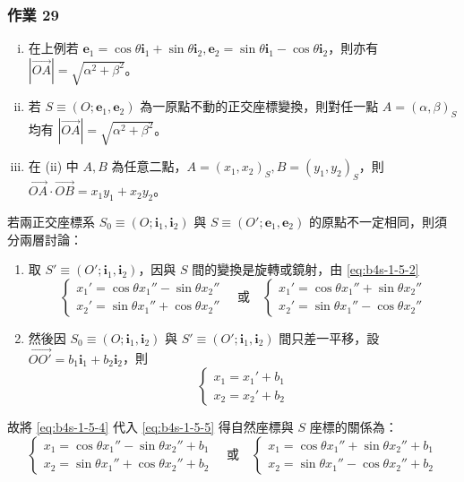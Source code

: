 \subsubsection*{作業 29}
\begin{enumerate}[(i)]
  \item 在上例若 $\mathbf{e}_1 = \cos\theta\mathbf{i}_1 + \sin\theta\mathbf{i}_2, \mathbf{e}_2 = \sin\theta\mathbf{i}_1 - \cos\theta\mathbf{i}_2$，則亦有 $|\vec{OA}| = \sqrt{\alpha^2 + \beta^2}$。
  \item 若 $S \equiv (O; \mathbf{e}_1, \mathbf{e}_2)$ 為一原點不動的正交座標變換，則對任一點 $A = (\alpha, \beta)_S$ 均有 $|\vec{OA}| = \sqrt{\alpha^2 + \beta^2}$。
  \item 在 (ii) 中 $A, B$ 為任意二點，$A = (x_1, x_2)_S, B = (y_1, y_2)_S$，則 $\vec{OA} \cdot \vec{OB} = x_1 y_1 + x_2 y_2$。
\end{enumerate}

若兩正交座標系 $S_0 \equiv (O; \mathbf{i}_1, \mathbf{i}_2)$ 與 $S \equiv (O'; \mathbf{e}_1, \mathbf{e}_2)$ 的原點不一定相同，則須分兩層討論：
\begin{enumerate}[(1)]
  \item 取 $S' \equiv (O'; \mathbf{i}_1, \mathbf{i}_2)$，因與 $S$ 間的變換是旋轉或鏡射，由 \eqref{eq:b4s-1-5-2}
  \begin{equation}
  \begin{cases} x_1' = \cos\theta x_1'' - \sin\theta x_2'' \\ x_2' = \sin\theta x_1'' + \cos\theta x_2'' \end{cases} \quad \text{或} \quad
  \begin{cases} x_1' = \cos\theta x_1'' + \sin\theta x_2'' \\ x_2' = \sin\theta x_1'' - \cos\theta x_2'' \end{cases} \label{eq:b4s-1-5-4}
  \end{equation}
  \item 然後因 $S_0 \equiv (O; \mathbf{i}_1, \mathbf{i}_2)$ 與 $S' \equiv (O'; \mathbf{i}_1, \mathbf{i}_2)$ 間只差一平移，設 $\vec{OO'} = b_1\mathbf{i}_1 + b_2\mathbf{i}_2$，則
  \begin{equation}
  \begin{cases} x_1 = x_1' + b_1 \\ x_2 = x_2' + b_2 \end{cases} \label{eq:b4s-1-5-5}
  \end{equation}
\end{enumerate}
故將 \eqref{eq:b4s-1-5-4} 代入 \eqref{eq:b4s-1-5-5} 得自然座標與 $S$ 座標的關係為：
\begin{equation}
\begin{cases}
x_1 = \cos\theta x_1'' - \sin\theta x_2'' + b_1 \\
x_2 = \sin\theta x_1'' + \cos\theta x_2'' + b_2
\end{cases} \quad \text{或} \quad
\begin{cases}
x_1 = \cos\theta x_1'' + \sin\theta x_2'' + b_1 \\
x_2 = \sin\theta x_1'' - \cos\theta x_2'' + b_2
\end{cases} \label{eq:b4s-1-5-6}
\end{equation}


